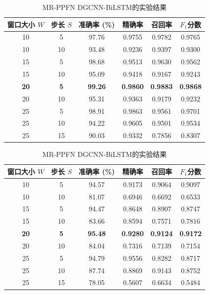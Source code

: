 \begin{table}[htbp]
    \ContinuedFloat
    \centering
    \begin{subtable}{\linewidth}
        \centering
        \caption{MR-PPFN SpiderCNN-BiLSTM的实验结果}
        \begin{tabular}{cc|cccc}
            \toprule
            窗口大小 $W$ & 步长 $S$ & 准确率 (\%) & 精确率 & 召回率 & $F_1$分数 \\
            \midrule
            10 & 5 & 97.76 & 0.9755 & 0.9782 & 0.9765 \\
            10 & 10 & 93.48 & 0.9236 & 0.9397 & 0.9300 \\
            15 & 5 & 98.68 & 0.9513 & 0.9630 & 0.9562 \\
            15 & 10 & 95.09 & 0.9418 & 0.9167 & 0.9243 \\
            \textbf{20} & \textbf{5} & \textbf{99.26} & \textbf{0.9860} & \textbf{0.9883} & \textbf{0.9868} \\
            20 & 10 & 95.31 & 0.9363 & 0.9179 & 0.9232 \\
            25 & 5 & 98.91 & 0.9863 & 0.9561 & 0.9701 \\
            25 & 10 & 94.22 & 0.9605 & 0.9501 & 0.9534 \\
            25 & 15 & 90.03 & 0.9332 & 0.7856 & 0.8307 \\
            \bottomrule
        \end{tabular}
        \label{tab:MR-PPFN SpiderCNN-BiLSTM_window_step_performance}
    \end{subtable}

    \vspace{0.4cm}

    \begin{subtable}{\linewidth}
        \centering
        \caption{MR-PPFN DGCNN-BiLSTM的实验结果}
        \begin{tabular}{cc|cccc}
            \toprule
            窗口大小 $W$ & 步长 $S$ & 准确率 (\%) & 精确率 & 召回率 & $F_1$分数 \\
            \midrule
            10 & 5 & 94.57 & 0.9173 & 0.9064 & 0.9097 \\
            10 & 10 & 81.07 & 0.6946 & 0.6692 & 0.6533 \\
            15 & 5 & 94.47 & 0.8648 & 0.8907 & 0.8747 \\
            15 & 10 & 83.66 & 0.8594 & 0.7571 & 0.7816 \\ 
            \textbf{20} & \textbf{5} & \textbf{95.48} & \textbf{0.9280} & \textbf{0.9124} & \textbf{0.9172} \\
            20 & 10 & 84.04 & 0.7316 & 0.7139 & 0.7154 \\
            25 & 5 & 94.79 & 0.9556 & 0.8282 & 0.8717 \\
            25 & 10 & 87.74 & 0.8869 & 0.9143 & 0.8752 \\
            25 & 15 & 78.05 & 0.5607 & 0.6634 & 0.5484 \\
            \bottomrule
        \end{tabular}
        \label{tab:MR-PPFN DGCNN-BiLSTM_window_step_performance}
    \end{subtable}


\end{table}
